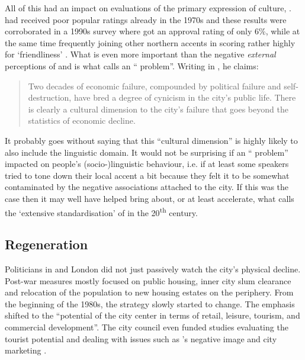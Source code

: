 All of this had an impact on evaluations of the primary expression of  culture, .
 had received poor popular ratings already in the 1970s and these results were corroborated in a 1990s survey where  got an approval rating of only 6\%, while at the same time frequently joining other northern accents in scoring rather highly for `friendliness' \citep[cf.][166]{wales2006}.
What is even more important than the negative \emph{external} perceptions of  and  is what \citet[255]{parkinson1990} calls an `` problem''.
Writing in \citeyear{parkinson1990}, he claims: 
	\begin{quote}
		Two decades of economic failure, compounded by political failure and self-destruction, have bred a degree of cynicism in the city's public life. There is clearly a cultural dimension to the city's failure that goes beyond the statistics of economic decline.
	\end{quote}
It probably goes without saying that this ``cultural dimension'' is highly likely to also include the linguistic domain.
It would not be surprising if an `` problem'' impacted on people's (socio-)linguistic behaviour, i.e. if at least some speakers tried to tone down their local accent a bit because they felt it to be somewhat contaminated by the negative associations attached to the city.
If this was the case then it may well have helped bring about, or at least accelerate, what \citet{knowles1978} calls the `extensive standardisation' of  in the 20\textsuperscript{th} century.

		\subsection{Regeneration}\label{sec.hist.20.regen}

Politicians in  and London did not just passively watch the city's physical decline.
Post-war measures mostly focused on public housing, inner city slum clearance and relocation of the population to new housing estates on the periphery.
From the beginning of the 1980s, the strategy slowly started to change.
The emphasis shifted to the ``potential of the city center in terms of retail, leisure, tourism, and commercial development''.
The city council even funded studies evaluating the tourist potential and dealing with issues such as 's negative image and city marketing \citep[cf.][250--253]{parkinson1990}.

